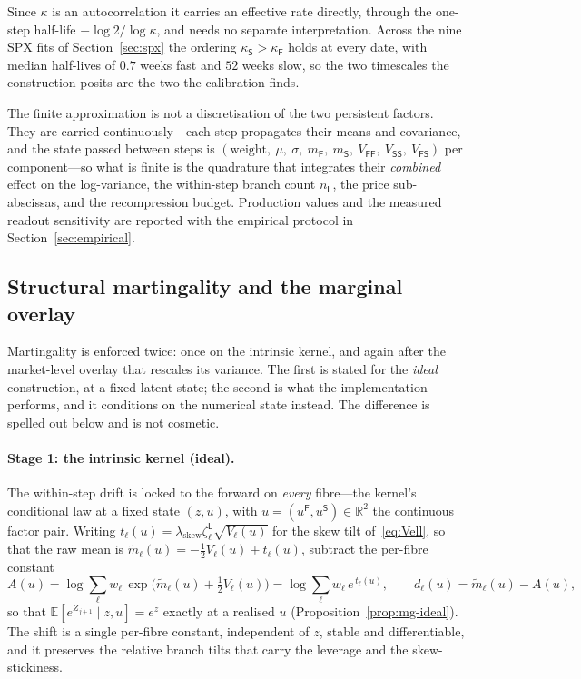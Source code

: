 \documentclass[11pt]{article}
\newcommand{\E}{\mathbb{E}}
\newcommand{\R}{\mathbb{R}}
\providecommand{\1}{\mathbf 1}
\begin{document}
Since $\kappa$ is an autocorrelation it carries an effective rate directly, through the one-step
half-life $-\log 2/\log\kappa$, and needs no separate interpretation. Across the nine SPX fits of
Section~\ref{sec:spx} the ordering $\kappa_{\mathsf S}>\kappa_{\mathsf F}$ holds at every date, with
median half-lives of $0.7$ weeks fast and $52$ weeks slow, so the two timescales the construction
posits are the two the calibration finds.

The finite approximation is not a discretisation of the two persistent factors. They are carried
continuously---each step propagates their means and covariance, and the state passed between steps is
$(\text{weight},\ \mu,\ \sigma,\ m_{\mathsf F},\ m_{\mathsf S},\ V_{\mathsf{FF}},\
V_{\mathsf{SS}},\ V_{\mathsf{FS}})$ per component---so what is finite is the quadrature that
integrates their \emph{combined} effect on the log-variance, the within-step branch count
$n_{\mathsf L}$, the price sub-abscissas, and the recompression budget. Production values and the
measured readout sensitivity are reported with the empirical protocol in
Section~\ref{sec:empirical}.

\subsection{Structural martingality and the marginal overlay}
\label{sec:fusion}\label{sec:decouple}

Martingality is enforced twice: once on the intrinsic kernel, and again after the market-level
overlay that rescales its variance. The first is stated for the \emph{ideal} construction, at a
fixed latent state; the second is what the implementation performs, and it conditions on the
numerical state instead. The difference is spelled out below and is not cosmetic.

\paragraph{Stage 1: the intrinsic kernel (ideal).} The within-step drift is locked to the forward on
\emph{every} fibre---the kernel's conditional law at a fixed state $(z,u)$, with
$u=(u^{\mathsf F},u^{\mathsf S})\in\R^2$ the continuous factor pair. Writing
$t_\ell(u)=\lambda_{\mathrm{skew}}\zeta^{\mathsf L}_\ell\sqrt{V_\ell(u)}$ for the skew tilt
of~\eqref{eq:Vell}, so that the raw mean is $\widetilde m_\ell(u)=-\tfrac12V_\ell(u)+t_\ell(u)$,
subtract the per-fibre constant
\begin{equation}
A(u)=\log\sum_\ell w_\ell\,\exp\!\big(\widetilde m_\ell(u)+\tfrac12 V_\ell(u)\big)
       =\log\sum_\ell w_\ell\,e^{\,t_\ell(u)},\qquad
d_\ell(u)=\widetilde m_\ell(u)-A(u),
\label{eq:mg-norm}
\end{equation}
so that $\E[e^{Z_{j+1}}\mid z,u]=e^{z}$ exactly at a realised $u$
(Proposition~\ref{prop:mg-ideal}). The shift is a single per-fibre constant,
independent of $z$, stable and differentiable, and it preserves the relative branch tilts that
carry the leverage and the skew-stickiness.
\end{document}
